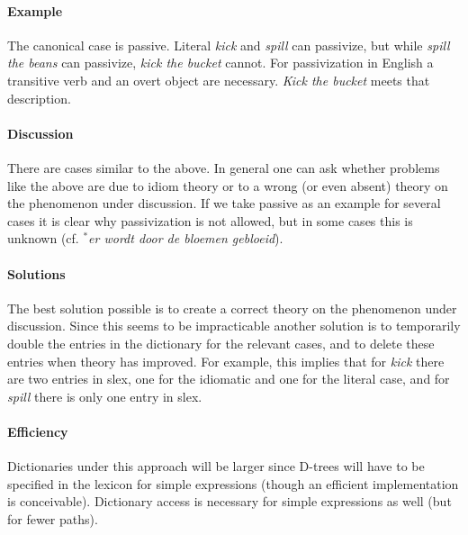\paragraph{Example}
The canonical case is passive. Literal {\em kick} and {\em spill} can
passivize, but while {\em spill the beans} can passivize, {\em kick the
bucket} cannot. For passivization in English a transitive verb and an overt 
object are necessary. {\em Kick the bucket} meets that description.

\paragraph{Discussion}
There are cases similar to the above. In general one can ask whether problems 
like the above are due to idiom theory or to a wrong (or even absent) theory on 
the phenomenon under discussion. If we take passive as an example for several 
cases it is clear why passivization is not allowed, but in some cases this is 
unknown (cf. $^{\ast}${\em er wordt door de bloemen gebloeid}).

\paragraph{Solutions}
The best solution possible is to create a correct theory on the phenomenon 
under discussion. Since this seems to be impracticable another solution is to 
temporarily double the entries in the dictionary for the relevant cases, and to 
delete these entries when theory has improved. For example, this implies that 
for {\em kick} there are two entries in slex, one for the idiomatic and one for 
the literal case, and for {\em spill} there is only one entry in slex.

\paragraph{Efficiency}
Dictionaries under this approach will be larger since D-trees will have to be 
specified in the lexicon for simple expressions (though an efficient 
implementation is conceivable). Dictionary access is necessary 
for simple expressions as well (but for fewer paths). 


